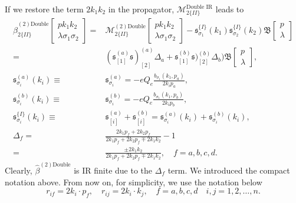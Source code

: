 If we restore the term $2k_1k_2$ in the propagator, $\mathcal{M}^\text{Double IR}_{2\{II\}}$ leads to
\begin{align}
\hat{\beta}_{2\{II\}}^{(2)\text{Double}}\left[\begin{array}{c}
pk_1k_2\\\lambda\sigma_1\sigma_2
\end{array}\right]=&\mathcal{M}_{2\{II\}}^{(2)\text{Double}}\left[\begin{array}{c}
pk_1k_2\\\lambda\sigma_1\sigma_2
\end{array}\right]-\mathfrak{s}^{\{I\}}_{\sigma_1}(k_1)\mathfrak{s}^{\{I\}}_{\sigma_2}(k_2)\mathfrak{B}\left[\begin{array}{c}
p\\\lambda
\end{array}\right]\nonumber\\
=&(\mathfrak{s}^{(a)}_{[1]}\mathfrak{s})^{(a)}_{[2]}\Delta_a+\mathfrak{s}^{(b)}_{[1]}\mathfrak{s})^{(b)}_{[2]}\Delta_b)\mathfrak{B}\left[\begin{array}{c}
p\\\lambda
\end{array}\right],\nonumber\\
\mathfrak{s}^{(a)}_{\sigma_i}(k_i)\equiv&\mathfrak{s}^{(a)}_{\sigma_i}=-eQ_e\frac{b_{\sigma_1}(k_1,p_a)}{2k_ip_a},\nonumber\\
\mathfrak{s}^{(b)}_{\sigma_i}(k_i)\equiv&\mathfrak{s}^{(b)}_{\sigma_i}=-eQ_e\frac{b_{\sigma_1}(k_1,p_b)}{2k_ip_b},\nonumber\\
\mathfrak{s}^{\{I\}}_{\sigma_i}(k_i)\equiv&\mathfrak{s}^{(a)}_{[i]}+\mathfrak{s}^{(b)}_{[i]}=\mathfrak{s}^{(a)}_{\sigma_i}(k_i)+\mathfrak{s}^{(b)}_{\sigma_i}(k_i),\nonumber\\
\Delta_f=&\frac{2k_1p_f+2k_2p_f}{2k_1p_f+2k_2p_f\mp 2k_1k_2}-1\nonumber\\
=&\frac{\pm2k_1k_2}{2k_1p_f+2k_2p_f\mp 2k_1k_2},\quad f=a,b,c,d.
\end{align}
Clearly, $\hat{\beta}^{(2)\text{Double}}$ is IR finite due to the $\Delta_f$ term.  We introduced the compact notation above. From now on, for simplicity, we use the notation below
\begin{equation}
r_{if}=2k_i\cdot p_f,\quad r_{ij}=2k_i\cdot k_j,\quad f=a,b,c,d\quad i,j=1,2,\ldots,n.
\end{equation}


